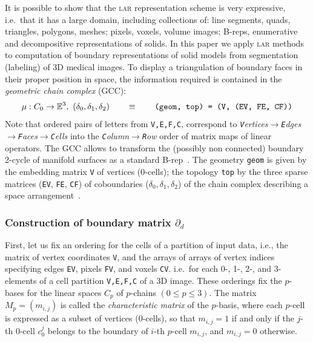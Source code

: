 It is possible to show that the \textsc{lar} representation scheme is very expressive, i.e.~that it  has a large domain,  including collections of: line segments, quads, triangles, polygons, meshes;  pixels, voxels, volume images; B-reps, enumerative and decompositive representations of solids. 
In this paper we apply \textsc{lar} methods to computation of boundary representations of solid models from segmentation (labeling) of 3D medical images.
To display a triangulation of  boundary faces  in their proper position in space, the information required is contained in the \emph{geometric chain complex} (GCC):
\[
\mu: C_0\to\mathbb{E}^3,\ (\delta_0, \delta_1, \delta_2)
\qquad\equiv\qquad
\texttt{(geom, top) = (V, (EV, FE, CF))}
\]
Note that ordered pairs of letters from \texttt{V,E,F,C}, correspond to \emph{\emph{\texttt{V}}ertices$\to$\emph{\texttt{E}}dges$\to$\emph{\texttt{F}}aces$\to$\emph{\texttt{C}}ells} into the 
\emph{\emph{\texttt{C}}olumn$\to$\emph{\texttt{R}}ow} order of matrix maps of linear operators.
The GCC allows to transform the (possibly non connected) boundary 2-cycle of manifold surfaces as a standard B-rep~\cite{shapiroSM:202}. 
The geometry \texttt{geom} is given by
the embedding matrix \texttt{V} of vertices (0-cells); the  topology \texttt{top} by the three sparse matrices (\texttt{EV}, \texttt{FE}, \texttt{CF}) of coboundaries ($\delta_0, \delta_1, \delta_2$) of the chain complex describing a   
space arrangement~\cite{paoluzzi2019finite}.



\subsubsection*{Construction of boundary matrix $\partial_d$}

First, let us fix an ordering for the cells of a partition of input data, i.e., the matrix of vertex coordinates \texttt{V}, and the arrays of arrays of vertex indices specifying edges \texttt{EV}, pixels \texttt{FV}, and voxels \texttt{CV}.
 i.e.~for each 0-, 1-, 2-, and 3-elements of a cell partition \texttt{V,E,F,C} of a 3D image. These orderings fix the $p$-bases for the linear spaces $C_p$ of $p$-chains $(0\leq p\leq 3)$.  
The matrix $M_p = (m_{i,j})$ is called the \emph{characteristic matrix} of the $p$-basis, where each $p$-cell is expressed as a subset of vertices (0-cells), so that 
$m_{i,j}=1$ if and only if the $j$-th  $0$-cell $c^j_0$ belongs 
to the boundary of $i$-th $p$-cell $m_{i,j}$, and $m_{i,j}=0$ otherwise.  


